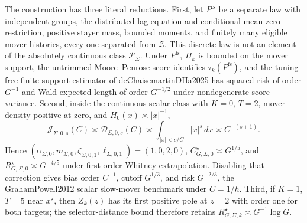 The construction has three literal reductions. First, let \(P^{\mathrm{fs}}\) be a separate law with independent groups, the distributed-lag equation and conditional-mean-zero restriction, positive stayer mass, bounded moments, and finitely many eligible mover histories, every one separated from \(\mathcal Z\). This discrete law is not an element of the absolutely continuous class \(\mathcal P_\Sigma\). Under \(P^{\mathrm{fs}}\), \(H_k\) is bounded on the mover support, the untrimmed Moore--Penrose score identifies \(\tau_k(P^{\mathrm{fs}})\), and the tuning-free finite-support estimator of deChaisemartinDHa2025 has squared risk of order \(G^{-1}\) and Wald expected length of order \(G^{-1/2}\) under nondegenerate score variance. Second, inside the continuous scalar class with \(K=0\), \(T=2\), mover density positive at zero, and \(H_0(x)\asymp|x|^{-1}\), \[\mathcal J_{\Sigma,0,s}(C)\asymp\mathcal D_{\Sigma,0,s}(C)\asymp\int_{|x|<c/C}|x|^s\,dx\asymp C^{-(s+1)}.\] Hence \((\alpha_{\Sigma,0},m_{\Sigma,0},\zeta_{\Sigma,0,1},\ell_{\Sigma,0,1})=(1,0,2,0)\), \(C_{G,\Sigma,0}^{\star}\asymp G^{1/5}\), and \(R_{G,\Sigma,0}^{\star}\asymp G^{-4/5}\) under first-order Whitney extrapolation. Disabling that correction gives bias order \(C^{-1}\), cutoff \(G^{1/3}\), and risk \(G^{-2/3}\), the GrahamPowell2012 scalar slow-mover benchmark under \(C=1/h\). Third, if \(K=1\), \(T=5\) near \(x^\star\), then \(Z_k(z)\) has its first positive pole at \(z=2\) with order one for both targets; the selector-distance bound therefore retains \(R_{G,\Sigma,k}^{\star}\asymp G^{-1}\log G\).